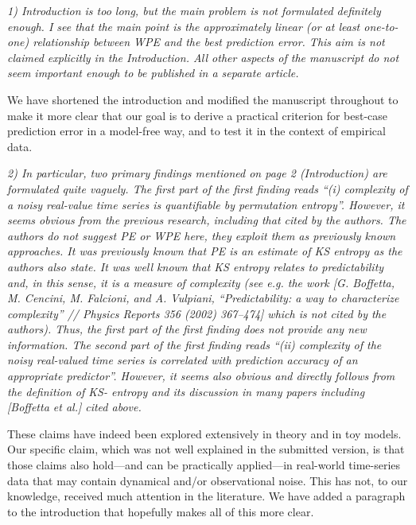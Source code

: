 \documentclass[12pt]{article}
\begin{document}
\smallskip

\emph{1) Introduction is too long, but the main problem is not
  formulated definitely enough. I see that the main point is the
  approximately linear (or at least one-to-one) relationship between
  WPE and the best prediction error. This aim is not claimed
  explicitly in the Introduction. All other aspects of the manuscript
  do not seem important enough to be published in a separate article.}

We have shortened the introduction and modified the manuscript
throughout to make it more clear that our goal is to derive a
practical criterion for best-case prediction error in a model-free
way, and to test it in the context of empirical data.

\smallskip

\emph{2) In particular, two primary findings mentioned on page 2
  (Introduction) are formulated quite vaguely. The first part of the
  first finding reads ``(i) complexity of a noisy real-value time
  series is quantifiable by permutation entropy''. However, it seems
  obvious from the previous research, including that cited by the
  authors. The authors do not suggest PE or WPE here, they exploit
  them as previously known approaches. It was previously known that PE
  is an estimate of KS entropy as the authors also state. It was well
  known that KS entropy relates to predictability and, in this sense,
  it is a measure of complexity (see e.g. the work [G. Boffetta,
    M. Cencini, M. Falcioni, and A.  Vulpiani, ``Predictability: a way
    to characterize complexity'' // Physics Reports 356 (2002)
    367–474] which is not cited by the authors). Thus, the first part
  of the first finding does not provide any new information. The
  second part of the first finding reads ``(ii) complexity of the
  noisy real-valued time series is correlated with prediction accuracy
  of an appropriate predictor''.  However, it seems also obvious and
  directly follows from the definition of KS- entropy and its
  discussion in many papers including [Boffetta et al.] cited above.}

These claims have indeed been explored extensively in theory and in
toy models.  Our specific claim, which was not well explained in the
submitted version, is that those claims also hold---and can be
practically applied---in real-world time-series data that may contain
dynamical and/or observational noise.  This has not, to our knowledge,
received much attention in the literature.  We have added a paragraph
to the introduction that hopefully makes all of this more clear.
\end{document}
